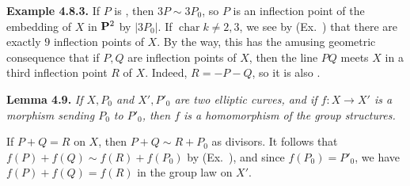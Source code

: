 {\medskip
\noindent\hypertarget{result-IV-4.8.3}{}\textbf{Example 4.8.3.} If $P$ is , then $3P\sim3P_0$, so $P$ is an inflection point of the embedding of $X$ in $\mathbf{P}^2$ by $|3P_0|$. If $\operatorname{char}k\ne2,3$, we see by (Ex.~) that there are exactly $9$ inflection points of $X$.  By the way, this has the amusing geometric consequence that if $P,Q$ are inflection points of $X$, then the line $PQ$ meets $X$ in a third inflection point $R$ of $X$. Indeed, $R=-P-Q$, so it is also .

\medskip
\noindent\hypertarget{result-IV-4.9}{}\textbf{Lemma 4.9.} \emph{If $X,P_0$ and $X',P'_0$ are two elliptic curves, and if $f\colon X\to X'$ is a morphism sending $P_0$ to $P'_0$, then $f$ is a homomorphism of the group structures.}

\Proof {}If $P+Q=R$ on $X$, then $P+Q\sim R+P_0$ as divisors. It follows that $f(P)+f(Q)\sim f(R)+f(P_0)$ by (Ex.~), and since $f(P_0)=P'_0$, we have $f(P)+f(Q)=f(R)$ in the group law on $X'$.
}
